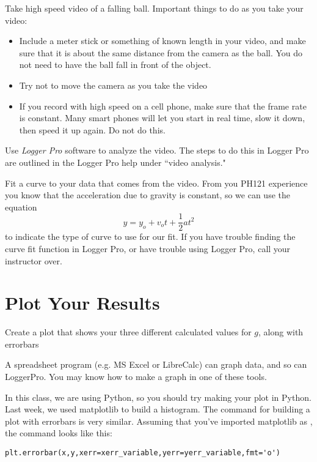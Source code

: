 \documentclass[twoside,11pt,ShortChapTitles]{BYUTextbook}
\begin{document}
Take high speed video of a falling ball. Important things to do as you take your video:
\begin{itemize}
\item Include a meter stick or something of known length in your video, and make sure that it is about the same distance from the camera as the ball.  You do not need to have the ball fall in front of the object.
\item Try not to move the camera as you take the video
\item If you record with high speed on a cell phone, make sure that the frame rate is constant.  Many smart phones will let you start in real time, slow it down, then speed it up again.  Do not do this.
\end{itemize}




Use \emph{Logger Pro} software to analyze the video. The steps to do this in Logger Pro are outlined in the Logger Pro help under
``video analysis."

Fit a curve to your data that comes from the video. From you PH121 experience
you know that the acceleration due to gravity is constant, so we can use the
equation
\[
y=y_{o}+v_{o}t+\frac{1}{2}at^{2}
\]
to indicate the type of curve to use for our fit. If you have trouble finding
the curve fit function in Logger Pro, or have trouble using Logger Pro, call
your instructor over.

\section{Plot Your Results}

Create a plot that shows your three different calculated values for $g$, along with errorbars

A spreadsheet program (e.g. MS Excel or LibreCalc) can graph data, and so can LoggerPro. You may know how to make a graph in one of these tools.

In this class, we are using Python, so you should try making your plot in Python.  Last week, we used matplotlib to build a histogram. The command for building a plot with errorbars is very similar.  Assuming that you've imported matplotlib as , the command looks like this:

\begin{lstlisting}
plt.errorbar(x,y,xerr=xerr_variable,yerr=yerr_variable,fmt='o')
\end{lstlisting}
\end{document}
